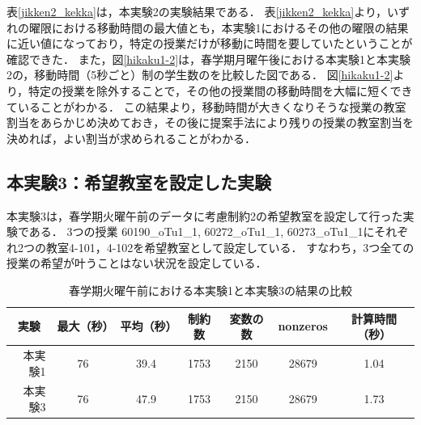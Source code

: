 \documentclass[12pt, a4paper, fleqn]{jreport}
\begin{document}
表\ref{jikken2_kekka}は，本実験2の実験結果である．
表\ref{jikken2_kekka}より，いずれの曜限における移動時間の最大値とも，本実験1におけるその他の曜限の結果に近い値になっており，特定の授業だけが移動に時間を要していたということが確認できた．
また，図\ref{hikaku1-2}は，春学期月曜午後における本実験1と本実験2の，移動時間（5秒ごと）制の学生数のを比較した図である．
図\ref{hikaku1-2}より，特定の授業を除外することで，その他の授業間の移動時間を大幅に短くできていることがわかる．
この結果より，移動時間が大きくなりそうな授業の教室割当をあらかじめ決めておき，その後に提案手法により残りの授業の教室割当を決めれば，よい割当が求められることがわかる．

\subsection{本実験3：希望教室を設定した実験}
本実験3は，春学期火曜午前のデータに考慮制約2の希望教室を設定して行った実験である．
3つの授業 60190\_oTu1\_1, 60272\_oTu1\_1, 60273\_oTu1\_1にそれぞれ2つの教室4-101，4-102を希望教室として設定している．
すなわち，3つ全ての授業の希望が叶うことはない状況を設定している．

\begin{table}[H]
\caption{春学期火曜午前における本実験1と本実験3の結果の比較}
\label{l:normal_information}
\begin{center}
\begin{tabular}{|r|cccccc|}
\hline
\multicolumn{1}{|c|}{実験} & 最大（秒） & 平均（秒） & 制約数 & 変数の数 & nonzeros & 計算時間（秒）\\
\hline
本実験1       & 76  & 39.4 & 1753 & 2150 & 28679 &  1.04\\
本実験3       & 76  & 47.9 & 1753 & 2150 & 28679 &  1.73\\
\hline
\end{tabular}
\end{center}
\end{table}
\end{document}
